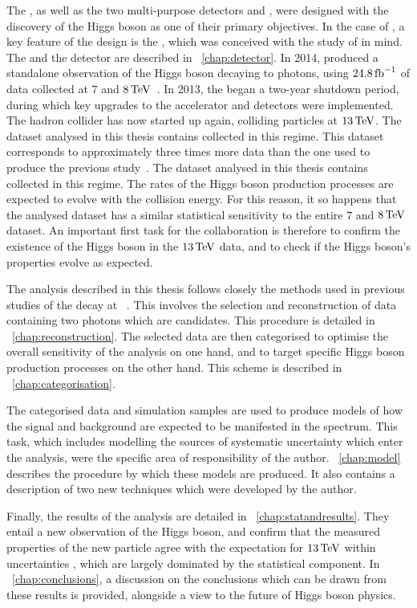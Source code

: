 The \LHC, as well as the two multi-purpose detectors \CMS and \ATLAS, were designed with the discovery of the Higgs boson as one of their primary objectives. In the case of \CMS, a key feature of the design is the \ECAL, which was conceived with the study of \Hgg in mind. The \LHC and the \CMS detector are described in \Chap~\ref{chap:detector}. In 2014, \CMS produced a standalone observation of the Higgs boson decaying to photons, using $24.8\,\text{fb}^{-1}$ of data collected at $7$ and $8\,\text{Te\hspace{-.08em}V}$~\cite{LegacyHgg}. In 2013, the \LHC began a two-year shutdown period, during which key upgrades to the accelerator and detectors were implemented. The hadron collider has now started up again, colliding particles at $13\,\text{Te\hspace{-.08em}V}$. 
\ifNewAnalysis
The dataset analysed in this thesis contains \thisanalysislumi\ifb collected in this regime. This dataset corresponds to approximately three times more data than the one used to produce the previous \Hgg study~\cite{CMS-PAS-HIG-16-020}.
\else
The dataset analysed in this thesis contains \thisanalysislumi\ifb collected in this regime. The rates of the Higgs boson production processes are expected to evolve with the collision energy. For this reason, it so happens that the analysed dataset has a similar statistical sensitivity to the entire $7$ and $8\,\text{Te\hspace{-.08em}V}$ dataset.
An important first task for the \CMS collaboration is therefore to confirm the existence of the Higgs boson in the $13\,\text{Te\hspace{-.08em}V}$ data, and to check if the Higgs boson's properties evolve as expected.  
\fi

The analysis described in this thesis follows closely the methods used in previous studies of the \Hgg decay at \CMS~\cite{LegacyHgg,CMS-PAS-HIG-15-005,CMS-PAS-HIG-16-020}. This involves the selection and reconstruction of data containing two photons which are \Hgg candidates. This procedure is detailed in \Chap~\ref{chap:reconstruction}. The selected data are then categorised to optimise the overall sensitivity of the analysis on one hand, and to target specific Higgs boson production processes on the other hand. This scheme is described in \Chap~\ref{chap:categorisation}. 

The categorised data and simulation samples are used to produce models of how the \Hgg signal and background are expected to be manifested in the \mgg spectrum. This task, which includes modelling the sources of systematic uncertainty which enter the analysis, were the specific area of responsibility of the author. \Chap~\ref{chap:model} describes the procedure by which these models are produced. It also contains a description of two new techniques which were developed by the author.

Finally, the results of the analysis are detailed in \Chap~\ref{chap:statandresults}. They entail a new observation of the Higgs boson, and confirm that the measured properties of the new particle agree with the \SM expectation for $13\,\text{Te\hspace{-.08em}V}$ within uncertainties 
\ifNewAnalysis
\else
, which are largely dominated by the statistical component.
\fi
In \Chap~\ref{chap:conclusions}, a discussion on the conclusions which can be drawn from these results is provided, alongside a view to the future of Higgs boson physics.


